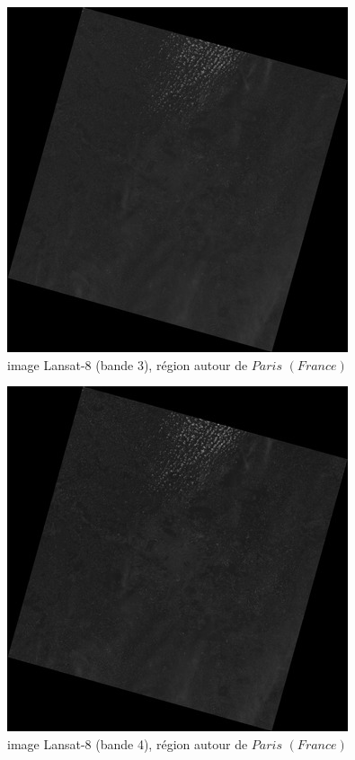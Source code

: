 \documentclass{book}
\begin{document}
\begin{figure}[H]
\begin{center}
\includegraphics[scale=0.8]{LC81990262015158LGN00_B3r.jpg}
\end{center}
\caption{image Lansat-8 (bande 3), région autour de $Paris$ $(France)$}
\label{band3}
\end{figure}

\begin{figure}[H]
\begin{center}
\includegraphics[scale=0.8]{LC81990262015158LGN00_B4r.jpg}
\end{center}
\caption{image Lansat-8 (bande 4), région autour de $Paris$ $(France)$}
\label{band4}
\end{figure}
\end{document}
